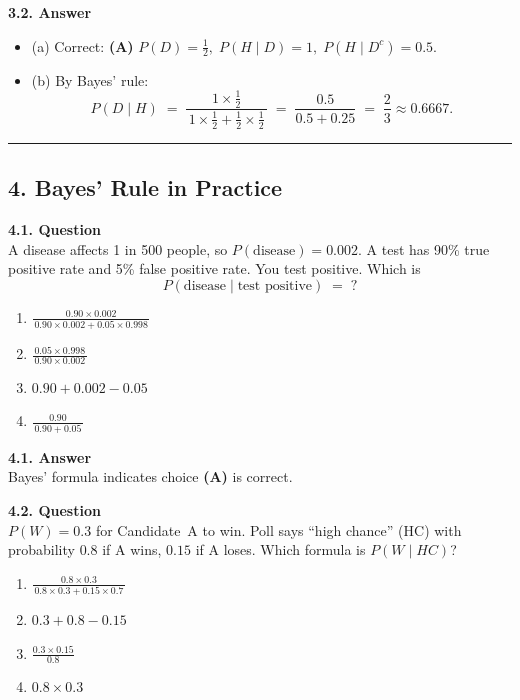 \documentclass[12pt]{article}
\begin{document}
\noindent
\textbf{3.2. Answer}
\begin{itemize}
\item (a) Correct: \textbf{(A)} $P(D)=\tfrac12,\;P(H\mid D)=1,\;P(H\mid D^c)=0.5.$
\item (b) By Bayes' rule:
  \[
    P(D\mid H) 
    \;=\; \frac{1 \times \tfrac12}{\,1 \times \tfrac12 + \tfrac12 \times \tfrac12\,}
    \;=\;\frac{0.5}{0.5+0.25}
    \;=\;\frac{2}{3}\approx 0.6667.
  \]
\end{itemize}

\hrule

\subsection*{4. Bayes' Rule in Practice}

\textbf{4.1. Question}\\
A disease affects 1 in 500 people, so $P(\text{disease})=0.002$. A test has 90\% true positive rate and 5\% false positive rate. You test positive. Which is
\[
  P(\text{disease}\mid \text{test positive}) \;=\; ?
\]
\begin{enumerate}[label=\Alph*.]
\item $\displaystyle \frac{0.90 \times 0.002}{\,0.90 \times 0.002 + 0.05 \times 0.998\,}$
\item $\displaystyle \frac{0.05 \times 0.998}{\,0.90 \times 0.002\,}$
\item $0.90 + 0.002 - 0.05$
\item $\displaystyle \frac{0.90}{\,0.90 + 0.05\,}$
\end{enumerate}

\noindent
\textbf{4.1. Answer}\\
Bayes' formula indicates choice \textbf{(A)} is correct.

\medskip

\textbf{4.2. Question}\\
$P(W)=0.3$ for Candidate~A to win. Poll says ``high chance'' (HC) with probability $0.8$ if A wins, $0.15$ if A loses. Which formula is $P(W\mid HC)$?
\begin{enumerate}[label=\Alph*.]
\item $\displaystyle \frac{0.8\times 0.3}{\,0.8\times 0.3 + 0.15\times 0.7\,}$
\item $0.3 + 0.8 - 0.15$
\item $\displaystyle \frac{0.3 \times 0.15}{\,0.8\,}$
\item $0.8\times 0.3$
\end{enumerate}
\end{document}
